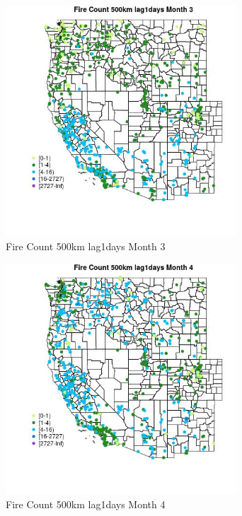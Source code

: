 \begin{figure} 
\centering  
\includegraphics[width=0.77\textwidth]{Code_Outputs/Report_ML_input_PM25_Step4_part_f_de_duplicated_aves_prioritize_24hr_obswNAs_MapObsMo3Fire_Count_500km_lag1days.jpg} 
\caption{\label{fig:Report_ML_input_PM25_Step4_part_f_de_duplicated_aves_prioritize_24hr_obswNAsMapObsMo3Fire_Count_500km_lag1days}Fire Count 500km lag1days Month 3} 
\end{figure} 
 

\clearpage 

\begin{figure} 
\centering  
\includegraphics[width=0.77\textwidth]{Code_Outputs/Report_ML_input_PM25_Step4_part_f_de_duplicated_aves_prioritize_24hr_obswNAs_MapObsMo4Fire_Count_500km_lag1days.jpg} 
\caption{\label{fig:Report_ML_input_PM25_Step4_part_f_de_duplicated_aves_prioritize_24hr_obswNAsMapObsMo4Fire_Count_500km_lag1days}Fire Count 500km lag1days Month 4} 
\end{figure} 
 

